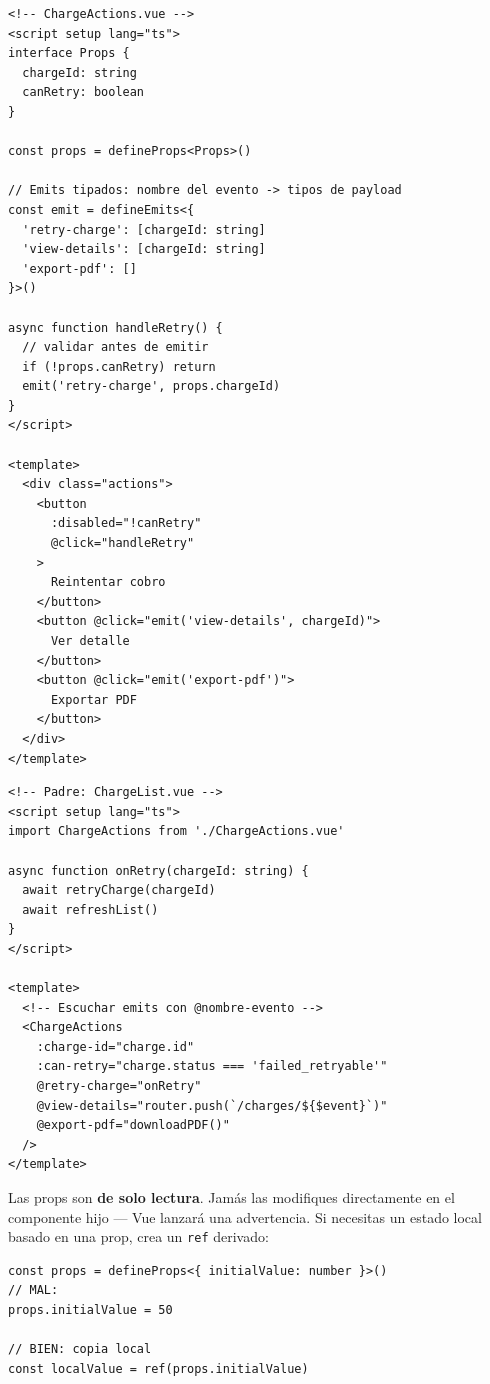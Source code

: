\documentclass[11pt,a4paper]{article}
\begin{document}
\begin{pergamino}
\begin{lstlisting}[style=vue]
<!-- ChargeActions.vue -->
<script setup lang="ts">
interface Props {
  chargeId: string
  canRetry: boolean
}

const props = defineProps<Props>()

// Emits tipados: nombre del evento -> tipos de payload
const emit = defineEmits<{
  'retry-charge': [chargeId: string]
  'view-details': [chargeId: string]
  'export-pdf': []
}>()

async function handleRetry() {
  // validar antes de emitir
  if (!props.canRetry) return
  emit('retry-charge', props.chargeId)
}
</script>

<template>
  <div class="actions">
    <button
      :disabled="!canRetry"
      @click="handleRetry"
    >
      Reintentar cobro
    </button>
    <button @click="emit('view-details', chargeId)">
      Ver detalle
    </button>
    <button @click="emit('export-pdf')">
      Exportar PDF
    </button>
  </div>
</template>
\end{lstlisting}
\end{pergamino}

\begin{pergamino}
\begin{lstlisting}[style=vue]
<!-- Padre: ChargeList.vue -->
<script setup lang="ts">
import ChargeActions from './ChargeActions.vue'

async function onRetry(chargeId: string) {
  await retryCharge(chargeId)
  await refreshList()
}
</script>

<template>
  <!-- Escuchar emits con @nombre-evento -->
  <ChargeActions
    :charge-id="charge.id"
    :can-retry="charge.status === 'failed_retryable'"
    @retry-charge="onRetry"
    @view-details="router.push(`/charges/${$event}`)"
    @export-pdf="downloadPDF()"
  />
</template>
\end{lstlisting}
\end{pergamino}

\begin{trampa}
Las props son \textbf{de solo lectura}. Jamás las modifiques directamente
en el componente hijo --- Vue lanzará una advertencia. Si necesitas un
estado local basado en una prop, crea un \texttt{ref} derivado:
\begin{lstlisting}[style=vue,numbers=none]
const props = defineProps<{ initialValue: number }>()
// MAL:
props.initialValue = 50

// BIEN: copia local
const localValue = ref(props.initialValue)
\end{lstlisting}
\end{trampa}
\end{document}
